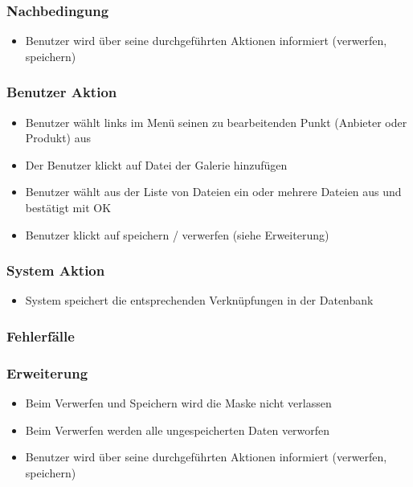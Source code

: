 \documentclass[a4paper,12pt]{article}
\begin{document}
\subsubsection{Nachbedingung}\label{nachbedingung-5}

\begin{itemize}

\item
  Benutzer wird über seine durchgeführten Aktionen informiert
  (verwerfen, speichern)
\end{itemize}

\subsubsection{Benutzer Aktion}\label{benutzer-aktion-5}

\begin{itemize}

\item
  Benutzer wählt links im Menü seinen zu bearbeitenden Punkt (Anbieter
  oder Produkt) aus
\item
  Der Benutzer klickt auf Datei der Galerie hinzufügen
\item
  Benutzer wählt aus der Liste von Dateien ein oder mehrere Dateien aus
  und bestätigt mit OK
\item
  Benutzer klickt auf speichern / verwerfen (siehe Erweiterung)
\end{itemize}

\subsubsection{System Aktion}\label{system-aktion-5}

\begin{itemize}

\item
  System speichert die entsprechenden Verknüpfungen in der Datenbank
\end{itemize}

\subsubsection{Fehlerfälle}\label{fehlerfalle-5}

\subsubsection{Erweiterung}\label{erweiterung-5}

\begin{itemize}

\item
  Beim Verwerfen und Speichern wird die Maske nicht verlassen
\item
  Beim Verwerfen werden alle ungespeicherten Daten verworfen
\item
  Benutzer wird über seine durchgeführten Aktionen informiert
  (verwerfen, speichern)
\end{itemize}
\end{document}
